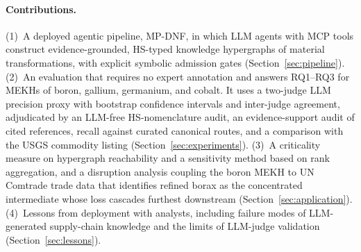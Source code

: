 \paragraph{Contributions.}
(1)~A deployed agentic pipeline, MP-DNF, in which LLM agents with MCP tools construct evidence-grounded, HS-typed knowledge hypergraphs of material transformations, with explicit symbolic admission gates (Section~\ref{sec:pipeline}).
(2)~An evaluation that requires no expert annotation and answers RQ1--RQ3 for MEKHs of boron, gallium, germanium, and cobalt. It uses a two-judge LLM precision proxy with bootstrap confidence intervals and inter-judge agreement, adjudicated by an LLM-free HS-nomenclature audit, an evidence-support audit of cited references, recall against curated canonical routes, and a comparison with the USGS commodity listing (Section~\ref{sec:experiments}).
(3)~A criticality measure on hypergraph reachability and a sensitivity method based on rank aggregation, and a disruption analysis coupling the boron MEKH to UN Comtrade trade data that identifies refined borax as the concentrated intermediate whose loss cascades furthest downstream (Section~\ref{sec:application}).
(4)~Lessons from deployment with analysts, including failure modes of LLM-generated supply-chain knowledge and the limits of LLM-judge validation (Section~\ref{sec:lessons}).
